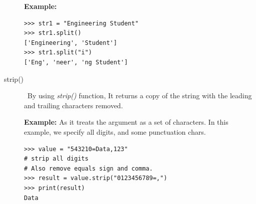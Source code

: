 \documentclass[11pt,a4paper]{article}
\begin{document}
\begin{description}
\textbf{Example: }
\begin{verbatim}
>>> str1 = "Engineering Student"
>>> str1.split()
['Engineering', 'Student']
>>> str1.split("i")
['Eng', 'neer', 'ng Student']
\end{verbatim}

\item[strip()]\
By using \emph{strip()} function, It returns a copy of the string with the leading and trailing characters removed.

\textbf{Example: }
As it treats the argument as a set of characters. In this example, we specify all digits, and some punctuation chars.
\begin{verbatim}
>>> value = "543210=Data,123"
# strip all digits
# Also remove equals sign and comma.
>>> result = value.strip("0123456789=,")
>>> print(result)
Data
\end{verbatim}

\end{description}
\end{document}
